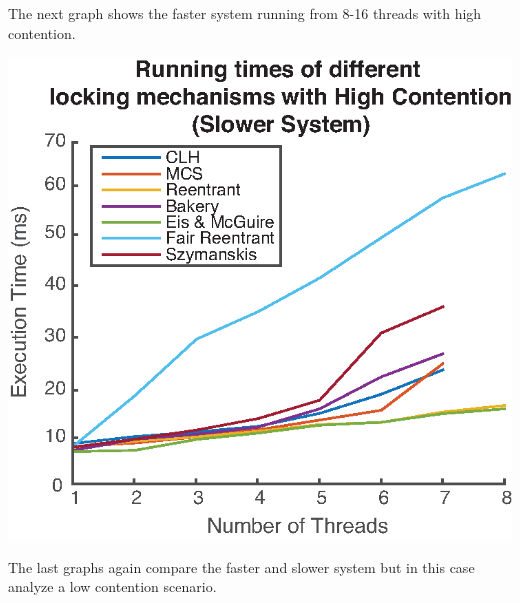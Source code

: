 \documentclass[FinalReport.tex]{subfiles}
\begin{document}
\bigskip

The next graph shows the faster system running from 8-16 threads with high contention.


\bigskip
	
	\begin{center}
	\includegraphics[scale = .8]{figures/evanComp_1-8_1000.eps}
	\end{center}	


\bigskip

The last graphs again compare the faster and slower system but in this case analyze a low contention scenario.

\bigskip
\end{document}
